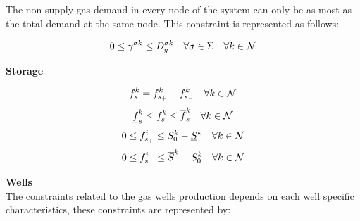 The non-supply gas demand in every node of the system can only be as most as the total demand at the same node. This constraint is represented as follows:

\begin{equation}
{0 \le \gamma^{\sigma k} \le D^{\sigma k}_{g} \quad \forall \sigma \in \Sigma \quad \forall k \in \cal{N}}
\label{nsg_limits}
\end{equation}


\textbf{Storage}

\begin{equation}
f_{s}^{k} = f_{s_+}^{k}  - f_{s_-}^{k}\quad \forall k \in \cal{N}
\label{fs}
\end{equation}
\begin{equation}
\underline{f}^{k}_{s} \le f^{k}_{s} \le \overline{f}^{k}_{s} \quad \forall k \in \cal{N}
\label{fs_limits}
\end{equation}
\begin{equation}
0 \le f_{s_+}^{i} \le S^{k}_{0}  - \underline{S}^{k} \quad \forall k \in \cal{N}
\label{fs+}
\end{equation}
\begin{equation}
0 \le f_{s_-}^{i} \le \overline{S}^{k} - S^{k}_{0} \quad \forall k \in \cal{N}
\label{fs-}
\end{equation}

\textbf{Wells}\\

The constraints related to the gas wells production depends on each well specific characteristics, these constraints are represented by:

